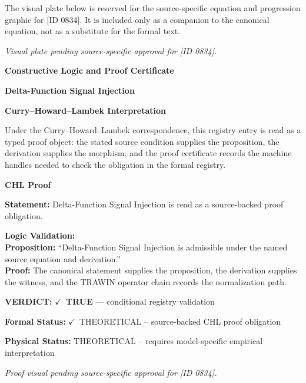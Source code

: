 \begingroup\footnotesize\sloppy
The visual plate below is reserved for the source-specific equation and progression graphic for [ID 0834]. It is included only as a companion to the canonical equation, not as a substitute for the formal text.
\par\endgroup
\begingroup\footnotesize\itshape
Visual plate pending source-specific approval for [ID 0834].
\par\endgroup

\clearpage
\begingroup\tzpsupportsetup
\noindent\textbf{\fontsize{10.8pt}{12.8pt}\selectfont [ID 0834] Constructive Logic and Proof Certificate}\par
\noindent\textbf{\fontsize{10pt}{12pt}\selectfont Delta-Function Signal Injection}\par
\vspace{0.45em}
\begingroup
\footnotesize
\setlength{\parskip}{0.22em}
\setlength{\parindent}{0pt}
\noindent\textbf{Curry--Howard--Lambek Interpretation}\par
Under the Curry--Howard--Lambek correspondence, this registry entry is read as a typed proof
object: the stated source condition supplies the proposition, the derivation supplies the
morphism, and the proof certificate records the machine handles needed to check the obligation
in the formal registry.

\vspace{0.45em}
\noindent\textbf{CHL Proof}\par
\textbf{Statement:} Delta-Function Signal Injection is read as a source-backed proof obligation.

\textbf{Logic Validation:}\\
\textbf{Proposition:} ``Delta-Function Signal Injection is admissible under the named source equation and derivation.''\\
\textbf{Proof:} The canonical statement supplies the proposition, the derivation supplies the witness, and the TRAWIN operator chain records the normalization path.

\textbf{VERDICT:} \ensuremath{\checkmark}\ \textbf{TRUE} --- conditional registry validation

\textbf{Formal Status:} \ensuremath{\checkmark}\ THEORETICAL -- source-backed CHL proof obligation

\textbf{Physical Status:} THEORETICAL -- requires model-specific empirical interpretation
\par\vspace{0.45em}
\par
\vfill
\begingroup\footnotesize\itshape
Proof visual pending source-specific approval for [ID 0834].
\par\endgroup
\vfill
\endgroup
\endgroup
